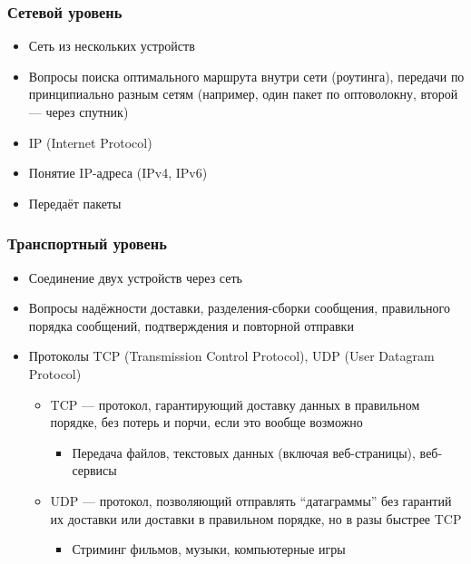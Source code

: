 \documentclass[xetex,mathserif,serif]{beamer}
\begin{document}
    \begin{frame}
        \frametitle{Сетевой уровень}
        \begin{itemize}
            \item Сеть из нескольких устройств
            \item Вопросы поиска оптимального маршрута внутри сети (роутинга), передачи по принципиально разным сетям (например, один пакет по оптоволокну, второй --- через спутник)
            \item IP (Internet Protocol)
            \item Понятие IP-адреса (IPv4, IPv6)
            \item Передаёт пакеты
        \end{itemize}
    \end{frame}

    \begin{frame}
        \frametitle{Транспортный уровень}
        \begin{itemize}
            \item Соединение двух устройств через сеть
            \item Вопросы надёжности доставки, разделения-сборки сообщения, правильного порядка сообщений, подтверждения и повторной отправки
            \item Протоколы TCP (Transmission Control Protocol), UDP (User Datagram Protocol)
            \begin{itemize}
                \item TCP --- протокол, гарантирующий доставку данных в правильном порядке, без потерь и порчи, если это вообще возможно
                \begin{itemize}
                    \item Передача файлов, текстовых данных (включая веб-страницы), веб-сервисы
                \end{itemize}
                \item UDP --- протокол, позволяющий отправлять ``датаграммы'' без гарантий их доставки или доставки в правильном порядке, но в разы быстрее TCP
                \begin{itemize}
                    \item Стриминг фильмов, музыки, компьютерные игры
                \end{itemize}
            \end{itemize}
        \end{itemize}
    \end{frame}
\end{document}
